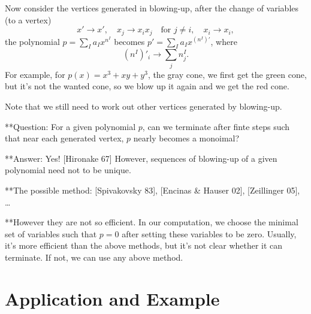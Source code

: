 \documentclass[12pt]{article}
\theoremstyle{definition}
\theoremstyle{plain}
\begin{document}
Now consider the vertices generated in blowing-up, after the change of variables (to a vertex)
\[
	x'\to x',\quad x_j\to x_ix_j\quad \text{for $j\neq i$},\quad x_i\to x_i,
\]
the polynomial $p=\sum_I a_I x^{n^I}$ becomes $p'=\sum_I a_I x^{(n^I)'}$, where
\[
	(n^I)'_i\longrightarrow \sum_j n^I_j.
\]
For example, for $p(x)=x^3+xy+y^3$, the gray cone, we first get the green cone, but it's not the wanted cone, so we blow up it again and we get the red cone.
\begin{center}
\end{center}
Note that we still need to work out other vertices generated by blowing-up. 


**Question: For a given polynomial $p$, can we terminate after finte steps 
such that near each generated vertex, $p$ nearly becomes a monoimal?

**Answer: Yes! [Hironake 67] However, sequences of blowing-up of a given polynomial
need not to be unique.

**The possible method: [Spivakovsky 83], [Encinas \& Hauser 02], [Zeillinger 05], \dots

**However they are not so efficient. In our computation, we choose the minimal set of
variables such that $p=0$ after setting these variables to be zero. Usually, it's more 
efficient than the above methods, but it's not clear whether it can terminate. If not,
we can use any above method.

\section{Application and Example}

\end{document}
